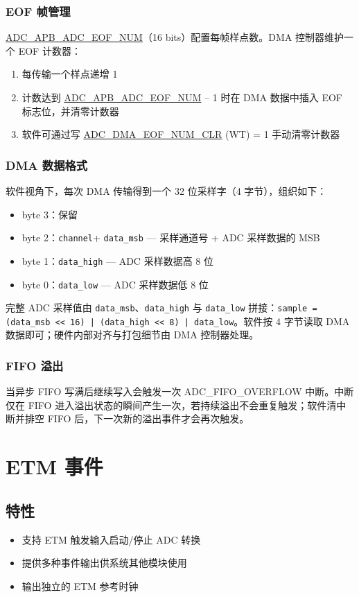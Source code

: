 \documentclass[main\_\_CN.tex]{subfiles}
\begin{document}
\subsubsection{EOF 帧管理}
\hyperref[fielddesc:ADCAPBADCEOFNUM]{ADC\_APB\_ADC\_EOF\_NUM}（16 bits）配置每帧样点数。DMA 控制器维护一个 EOF 计数器：
\begin{enumerate}
    \item 每传输一个样点递增 1
    \item 计数达到 \hyperref[fielddesc:ADCAPBADCEOFNUM]{ADC\_APB\_ADC\_EOF\_NUM} – 1 时在 DMA 数据中插入 EOF 标志位，并清零计数器 
    \item 软件可通过写 \hyperref[fielddesc:ADCDMAEOFNUMCLR]{ADC\_DMA\_EOF\_NUM\_CLR} (WT) = 1 手动清零计数器
\end{enumerate}

\subsubsection{DMA 数据格式}
软件视角下，每次 DMA 传输得到一个 32 位采样字（4 字节），组织如下：
\begin{itemize}
    \item byte 3：保留
    \item byte 2：\verb+channel++ \verb+data_msb+ — 采样通道号 + ADC 采样数据的 MSB
    \item byte 1：\verb+data_high+ — ADC 采样数据高 8 位
    \item byte 0：\verb+data_low+ — ADC 采样数据低 8 位
\end{itemize}
完整 ADC 采样值由 \verb+data_msb+、\verb+data_high+ 与 \verb+data_low+ 拼接：\verb+sample = (data_msb << 16) | (data_high << 8) | data_low+。软件按 4 字节读取 DMA 数据即可；硬件内部对齐与打包细节由 DMA 控制器处理。

\subsubsection{FIFO 溢出}
当异步 FIFO 写满后继续写入会触发一次 ADC\_FIFO\_OVERFLOW 中断。中断仅在 FIFO 进入溢出状态的瞬间产生一次，若持续溢出不会重复触发；软件清中断并排空 FIFO 后，下一次新的溢出事件才会再次触发。


\section{ETM 事件}
\label{sec:adc-etm}

\subsection{特性}
\begin{itemize}
    \item 支持 ETM 触发输入启动/停止 ADC 转换
    \item 提供多种事件输出供系统其他模块使用
    \item 输出独立的 ETM 参考时钟
\end{itemize}
\end{document}
